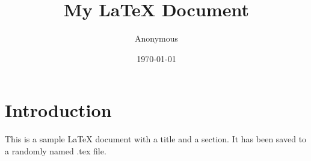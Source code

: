 \documentclass{article}
\title{My LaTeX Document}
\author{Anonymous}
\date{\today}
\begin{document}
\maketitle
\section{Introduction}
This is a sample LaTeX document with a title and a section. It has been saved to a randomly named .tex file.
\end{document}
